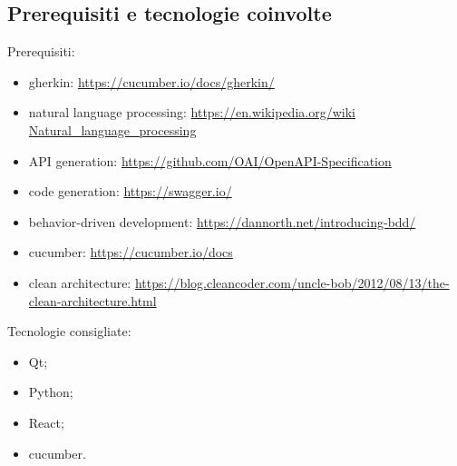 \subsection{Prerequisiti e tecnologie coinvolte}
Prerequisiti:
\begin{itemize}
\item gherkin: \url{https://cucumber.io/docs/gherkin/}
\item natural language processing: \url{https://en.wikipedia.org/wiki Natural_language_processing}
\item API generation: \url{https://github.com/OAI/OpenAPI-Specification}
\item code generation: \url{https://swagger.io/}
\item behavior-driven development: \url{https://dannorth.net/introducing-bdd/}
\item cucumber: \url{https://cucumber.io/docs}
\item clean architecture: \url{https://blog.cleancoder.com/uncle-bob/2012/08/13/the-clean-architecture.html}
\end{itemize}
Tecnologie consigliate:
\begin{itemize}
\item Qt;
\item Python;
\item React;
\item cucumber.
\end{itemize}

